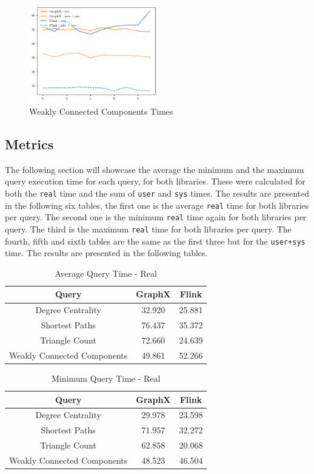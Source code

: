 \documentclass[conference]{IEEEtran}
\begin{document}
\begin{figure}[htbp]
\centerline{\includegraphics[width=0.5\textwidth]{weakly-connected-components-times.png}}
\caption{Weakly Connected Components Times}
\label{weaklyTimes}
\end{figure}

\subsection{Metrics}

The following section will showcase the average the minimum and the maximum query execution time for each query, for both libraries. These were calculated for both the \verb|real| time and the sum of \verb|user| and \verb|sys| times. The results are presented in the following six tables, the first one is the average \verb|real| time for both libraries per query. The second one is the minimum \verb|real| time again for both libraries per query. The third is the maximum \verb|real| time for both libraries per query. The fourth, fifth and sixth tables are the same as the first three but for the \verb|user+sys| time. The results are presented in the following tables.  

\begin{table}[htbp]
\caption{Average Query Time - Real}
\centering
\begin{tabular}{|c|c|c|}
\hline
\textbf{Query} & \textbf{GraphX} & \textbf{Flink}\\
\hline
Degree Centrality & 32.920 & 25.881 \\
\hline
Shortest Paths & 76.437 & 35.372 \\
\hline
Triangle Count & 72.660 & 24.639 \\
\hline
Weakly Connected Components & 49.861 & 52.266 \\
\hline
\end{tabular}
\end{table}

\begin{table}[htbp]
\caption{Minimum Query Time - Real}
\centering
\begin{tabular}{|c|c|c|}
\hline
\textbf{Query} & \textbf{GraphX} & \textbf{Flink}\\
\hline
Degree Centrality & 29.978 & 23.598 \\
\hline
Shortest Paths &71.957 & 32.272 \\
\hline
Triangle Count & 62.858 & 20.068 \\
\hline
Weakly Connected Components & 48.523 & 46.504 \\
\hline
\end{tabular}
\end{table}
\end{document}
